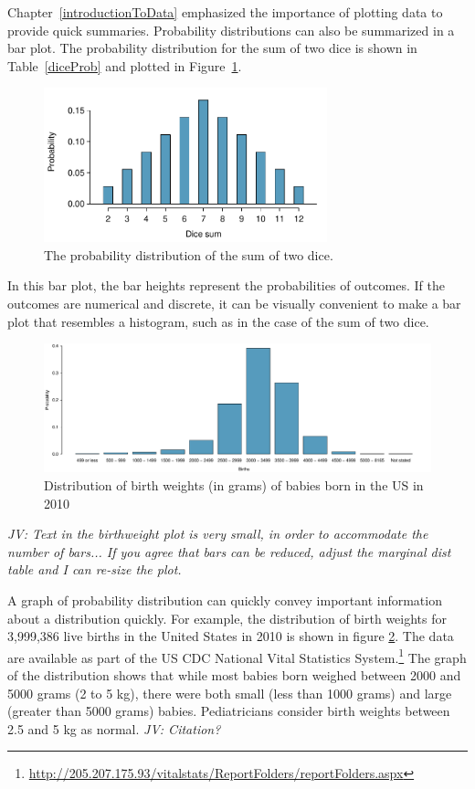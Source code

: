 \begin{doublespace}
Chapter~\ref{introductionToData} emphasized the importance of plotting data to provide quick summaries. Probability distributions can also be summarized in a bar plot. The probability distribution for the sum of two dice is shown in Table~\ref{diceProb} and plotted in Figure~\ref{diceSumDist}.

\begin{figure}
\centering
\includegraphics[width=0.73\textwidth]{ch_probability_oi_biostat/figures/diceSumDist/diceSumDist}
\caption{The probability distribution of the sum of two dice.}
\label{diceSumDist}
\end{figure}

In this bar plot, the bar heights represent the probabilities of outcomes. If the outcomes are numerical and discrete, it can be visually convenient to make a bar plot that resembles a histogram, such as in the case of the sum of two dice.  

\begin{figure}[h]
	\includegraphics[width=\textwidth]{ch_probability_oi_biostat/figures/birthwtMarginalDist/birthwtMarginalDist.pdf}
	\caption{Distribution of birth weights (in grams) of babies born in the US in 2010}
	\label{fig:birthwtMarginalDist}
\end{figure}

\textit{JV: Text in the birthweight plot is very small, in order to accommodate the number of bars... If you agree that bars can be reduced, adjust the marginal dist table and I can re-size the plot.}

A graph of probability distribution can quickly convey important information about a distribution quickly. For example, the distribution of birth weights for 3,999,386 live births in the United States in 2010 is shown in figure \ref{fig:birthwtMarginalDist}.  The data are available as part of the US CDC National Vital Statistics System.\footnote{\url{http://205.207.175.93/vitalstats/ReportFolders/reportFolders.aspx}} The graph of the distribution shows that while most babies born weighed between 2000 and 5000 grams (2 to 5 kg), there were both small (less than 1000 grams) and large (greater than 5000 grams) babies. Pediatricians consider birth weights between 2.5 and 5 kg as normal. \textit{JV: Citation?}


\end{doublespace}
